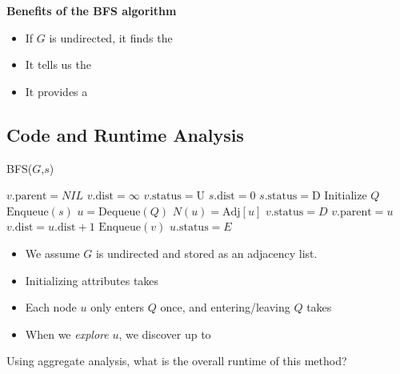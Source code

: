 \documentclass[11  pt]{exam}
\begin{document}
	\textbf{Benefits of the BFS algorithm}
	\begin{itemize}
		\item If $G$ is undirected, it finds the  \\%
		\item It tells us the \\ %
		\item It provides a  
	\end{itemize}
	
	
	
	
	\newpage
	
	\subsection{Code and Runtime Analysis}
	\begin{algorithm}[t]
		\textsc{BFS}($G$,$s$)
		\begin{algorithmic}
			\State $v.\text{parent} = NIL$
			\State $v.\text{dist} = \infty$
			\State $v.\text{status} = \text{U}$
			\EndFor
			\State $s.\text{dist} = 0$
			\State $s.\text{status} = \text{D}$
			\State Initialize $Q$
			\State $\text{Enqueue}(s)$
			\State $u = \text{Dequeue}(Q)$
			\State $N(u) = \text{Adj}[u]$
			\State $v.\text{status} = D$
			\State $v.\text{parent} = u$
			\State $v.\text{dist} = u.\text{dist} + 1$
			\State $\text{Enqueue}(v)$
			\EndIf
			\EndFor
			\State $u.\text{status} = E$
			\EndWhile
		\end{algorithmic}
	\end{algorithm}
	
	
	\begin{itemize}
		\item We assume $G$ is undirected and stored as an adjacency list.
		\item Initializing attributes takes 
		\item Each node $u$ only enters $Q$ once, and entering/leaving $Q$ takes 
		\item When we \emph{explore} $u$, we discover up to 
	\end{itemize}
	Using aggregate analysis, what is the overall runtime of this method? \\

	
	\newpage
	
\end{document}
